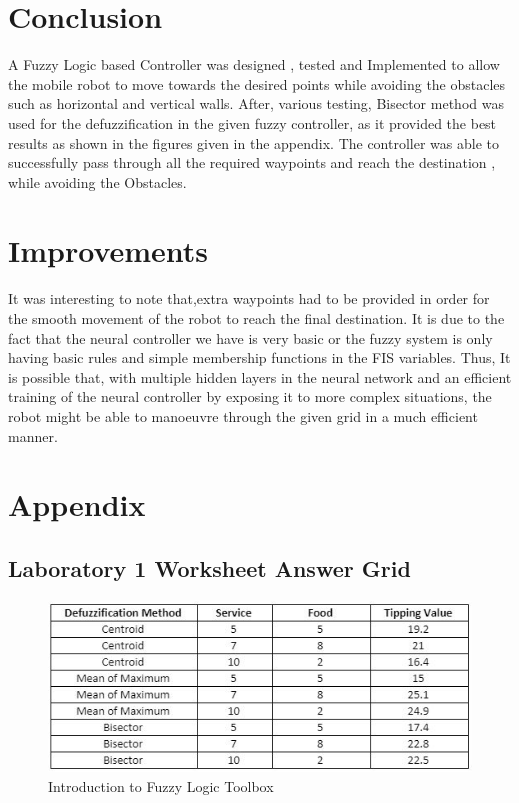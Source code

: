 \documentclass{l4proj}
\begin{document}
\section{Conclusion}
A Fuzzy Logic based Controller was designed , tested and Implemented to allow the mobile robot to move towards the desired points while avoiding the obstacles such as horizontal and vertical walls. After, various testing, Bisector method was used for the defuzzification in the given fuzzy controller, as it provided the best results as shown in the figures given in the appendix. The controller was able to successfully pass through all the required waypoints and reach the destination , while avoiding the Obstacles.  


\section{Improvements}
It was interesting to note that,extra waypoints had to be provided in order for the smooth movement of the robot to reach the final destination. \newline It is due to the fact that the neural controller we have is very basic  or the fuzzy system is only having basic rules and simple membership functions in the FIS variables. \newline Thus, It is possible that, with multiple hidden layers in the neural network and an efficient training of the neural controller by exposing it to more complex situations, the robot might be able to manoeuvre through the given grid in a much efficient manner.

\section{Appendix}

\subsection{Laboratory 1 Worksheet Answer Grid }
\begin{figure}[htb]
    \centering
    \includegraphics[width=0.5\linewidth]{images/Table1.JPG}    

    \caption{Introduction to Fuzzy Logic Toolbox 
    }

    \label{fig:model1} 
\end{figure}
\end{document}
